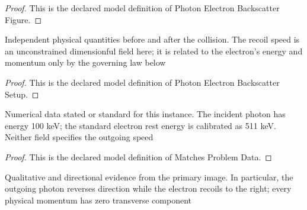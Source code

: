 \begin{proof}
  This is the declared model definition of Photon Electron Backscatter Figure.
\end{proof}
\begin{definition}
  \label{def:physics:phyx-mini-0569:phyxminiproblems-problemphyxmini0569-photonelectronbackscattersetup}
  Independent physical quantities before and after the collision. The recoil speed is an unconstrained dimensionful field here; it is related to the electron's energy and momentum only by the governing law below
\end{definition}
\begin{proof}
  This is the declared model definition of Photon Electron Backscatter Setup.
\end{proof}
\begin{definition}
  \label{def:physics:phyx-mini-0569:phyxminiproblems-problemphyxmini0569-matchesproblemdata}
  Numerical data stated or standard for this instance. The incident photon has energy 100 keV; the standard electron rest energy is calibrated as 511 keV. Neither field specifies the outgoing speed
\end{definition}
\begin{proof}
  This is the declared model definition of Matches Problem Data.
\end{proof}
\begin{definition}
  \label{def:physics:phyx-mini-0569:phyxminiproblems-problemphyxmini0569-matchesprimarybackscatterfigure}
  Qualitative and directional evidence from the primary image. In particular, the outgoing photon reverses direction while the electron recoils to the right; every physical momentum has zero transverse component
\end{definition}
